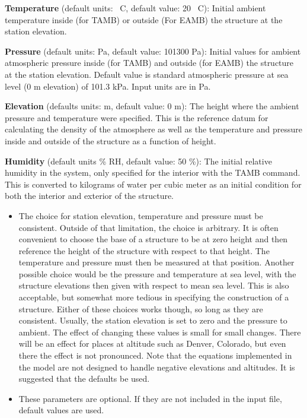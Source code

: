 \textbf{Temperature} (default units: \degc~C, default value: 20 \degc~C): Initial ambient temperature inside (for TAMB) or outside (For EAMB) the structure at the station elevation.

\textbf{Pressure} (default units: Pa, default value: 101300 Pa): Initial values for ambient atmospheric pressure inside (for TAMB) and outside (for EAMB) the structure at the station elevation. Default value is standard atmospheric pressure at sea level (0 m elevation) of 101.3 kPa. Input units are in Pa.

\textbf{Elevation} (defaults units: m, default value: 0 m): The height where the ambient pressure and temperature were specified.  This is the reference datum for calculating the density of the atmosphere as well as the temperature and pressure inside and outside of the structure as a function of height.

\textbf{Humidity} (default units \% RH, default value: 50 \%): The initial relative humidity in the system, only specified for the interior with the TAMB command.  This is converted to kilograms of water per cubic meter as an initial condition for both the interior and exterior of the structure.


\begin{itemize}
\item The choice for station elevation, temperature and pressure must be consistent.  Outside of that limitation, the choice is arbitrary.  It is often convenient to choose the base of a structure to be at zero height and then reference the height of the structure with respect to that height.  The temperature and pressure must then be measured at that position.  Another possible choice would be the pressure and temperature at sea level, with the structure elevations then given with respect to mean sea level.  This is also acceptable, but somewhat more tedious in specifying the construction of a structure.  Either of these choices works though, so long as they are consistent. Usually, the station elevation is set to zero and the pressure to ambient. The effect of changing these values is small for small changes. There will be an effect for places at altitude such as Denver, Colorado, but even there the effect is not pronounced. Note that the equations implemented in the model are not designed to handle negative elevations and altitudes. It is suggested that the defaults be used.

\item These parameters are optional. If they are not included in the input file, default values are used.
\end{itemize}

